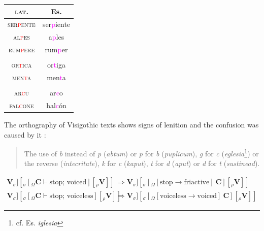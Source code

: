 \documentclass{report}[12pt]
\begin{document}
\begin{center}
  \begin{tabular}{c c}
    \textsc{lat.} & Es. \\
    \hline
    \textsc{ser\textcolor{red}{p}ente} & ser\textcolor{magenta}{p}iente \\
    \textsc{al\textcolor{red}{p}es} & a\textcolor{magenta}{p}les \\
    \textsc{rum\textcolor{red}{p}ere} & rum\textcolor{magenta}{p}er \\
                  & \\
    \textsc{or\textcolor{red}{t}ica} & or\textcolor{magenta}{t}iga \\
    \textsc{men\textcolor{red}{t}a} & men\textcolor{magenta}{t}a \\
                  & \\
    \textsc{ar\textcolor{red}{c}u} & ar\textcolor{magenta}{c}o \\
    \textsc{fal\textcolor{red}{c}one} & hal\textcolor{magenta}{c}ón \\
  \end{tabular}
\end{center}

The orthography of Visigothic texts shows signs of lenition and the confusion was caused by it \parencite[p.~159]{latin_palaeography}:
\begin{quote}
  The use of \emph{b} instead of \emph{p} (\emph{abtum}) or \emph{p} for \emph{b} (\emph{puplicum}), \emph{g} for \emph{c} (\emph{eglesia}\footnote{cf. Es. \emph{iglesia}}) or the reverse (\emph{intecritate}), \emph{k} for \emph{c} (\emph{kaput}), \emph{t} for \emph{d} (\emph{aput}) or \emph{d} for \emph{t} (\emph{sustinead}).
\end{quote}

\begin{tcolorbox}
  \begin{align*}
    \textbf{V} _σ] [_σ [_Ω \textbf{C}\vdash \text{stop; voiced} ] [_ρ \textbf{V} ] ]
    & \Rightarrow
      \textbf{V} _σ] [_σ [_Ω [\text{stop} \rightarrow \text{friactive}]\ \textbf{C} ] [_ρ \textbf{V} ] ] \\
    \textbf{V} _σ] [_σ [_Ω \textbf{C}\vdash \text{stop; voiceless} ] [_ρ \textbf{V} ] ]
    & \Rightarrow
      \textbf{V} _σ] [_σ [_Ω [\text{voiceless} \rightarrow \text{voiced}]\ \textbf{C} ] [_ρ \textbf{V} ] ]
  \end{align*}
\end{tcolorbox}

\pagebreak
\end{document}
